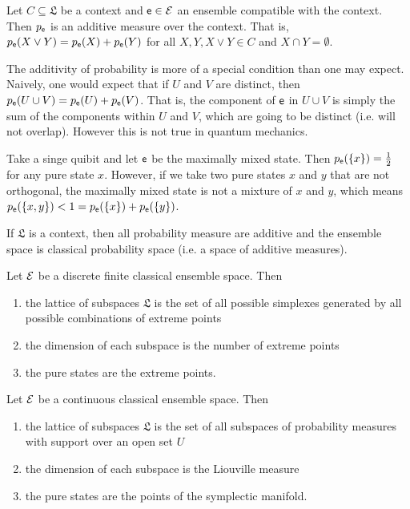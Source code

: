 \begin{conj}
	Let $C \subseteq \mathfrak{L}$ be a context and $\mathsf{e} \in \mathcal{E}$ an ensemble compatible with the context. Then $p_{\mathsf{e}}$ is an additive measure over the context. That is, $p_{\mathsf{e}}(X \vee Y) = p_{\mathsf{e}}(X) + p_{\mathsf{e}}(Y)$ for all $X, Y, X \vee Y \in C$ and $X \cap Y = \emptyset$.
\end{conj}

\begin{remark}
	The additivity of probability is more of a special condition than one may expect. Naively, one would expect that if $U$ and $V$ are distinct, then $p_{\mathsf{e}}(U \cup V) = p_{\mathsf{e}}(U) + p_{\mathsf{e}}(V)$. That is, the component of $\mathsf{e}$ in $U \cup V$ is simply the sum of the components within $U$ and $V$, which are going to be distinct (i.e. will not overlap). However this is not true in quantum mechanics.
	
	Take a singe quibit and let $\mathsf{e}$ be the maximally mixed state. Then $p_{\mathsf{e}}(\{x\}) = \frac{1}{2}$ for any pure state $x$. However, if we take two pure states $x$ and $y$ that are not orthogonal, the maximally mixed state is not a mixture of $x$ and $y$, which means $p_{\mathsf{e}}(\{x, y\}) < 1 = p_{\mathsf{e}}(\{x\}) + p_{\mathsf{e}}(\{y\})$.
\end{remark}

\begin{conj}
	If $\mathfrak{L}$ is a context, then all probability measure are additive and the ensemble space is classical probability space (i.e. a space of additive measures).
\end{conj}


\begin{conj}
	Let $\mathcal{E}$ be a discrete finite classical ensemble space. Then
	\begin{enumerate}
		\item the lattice of subspaces $\mathfrak{L}$ is the set of all possible simplexes generated by all possible combinations of extreme points
		\item the dimension of each subspace is the number of extreme points
		\item the pure states are the extreme points.
	\end{enumerate}
\end{conj}

\begin{conj}
	Let $\mathcal{E}$ be a continuous classical ensemble space. Then
	\begin{enumerate}
		\item the lattice of subspaces $\mathfrak{L}$ is the set of all subspaces of probability measures with support over an open set $U$
		\item the dimension of each subspace is the Liouville measure
		\item the pure states are the points of the symplectic manifold.
	\end{enumerate}
\end{conj}

